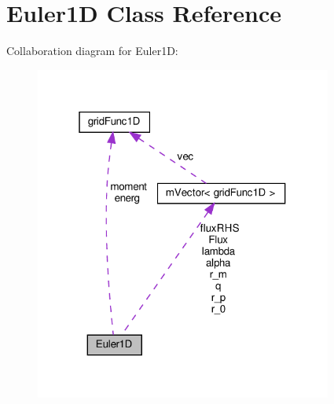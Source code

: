 \hypertarget{classEuler1D}{}\section{Euler1D Class Reference}
\label{classEuler1D}


Collaboration diagram for Euler1D\+:
\nopagebreak
\begin{figure}[H]
\begin{center}
\leavevmode
\includegraphics[width=277pt]{classEuler1D__coll__graph}
\end{center}
\end{figure}
